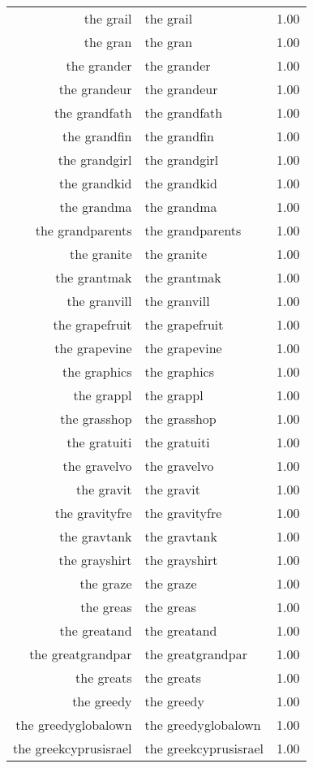 \begin{table}[ht]
\begin{tabular}{rlr}
  the grail & the grail & 1.00 \\ 
  the gran & the gran & 1.00 \\ 
  the grander & the grander & 1.00 \\ 
  the grandeur & the grandeur & 1.00 \\ 
  the grandfath & the grandfath & 1.00 \\ 
  the grandfin & the grandfin & 1.00 \\ 
  the grandgirl & the grandgirl & 1.00 \\ 
  the grandkid & the grandkid & 1.00 \\ 
  the grandma & the grandma & 1.00 \\ 
  the grandparents & the grandparents & 1.00 \\ 
  the granite & the granite & 1.00 \\ 
  the grantmak & the grantmak & 1.00 \\ 
  the granvill & the granvill & 1.00 \\ 
  the grapefruit & the grapefruit & 1.00 \\ 
  the grapevine & the grapevine & 1.00 \\ 
  the graphics & the graphics & 1.00 \\ 
  the grappl & the grappl & 1.00 \\ 
  the grasshop & the grasshop & 1.00 \\ 
  the gratuiti & the gratuiti & 1.00 \\ 
  the gravelvo & the gravelvo & 1.00 \\ 
  the gravit & the gravit & 1.00 \\ 
  the gravityfre & the gravityfre & 1.00 \\ 
  the gravtank & the gravtank & 1.00 \\ 
  the grayshirt & the grayshirt & 1.00 \\ 
  the graze & the graze & 1.00 \\ 
  the greas & the greas & 1.00 \\ 
  the greatand & the greatand & 1.00 \\ 
  the greatgrandpar & the greatgrandpar & 1.00 \\ 
  the greats & the greats & 1.00 \\ 
  the greedy & the greedy & 1.00 \\ 
  the greedyglobalown & the greedyglobalown & 1.00 \\ 
  the greekcyprusisrael & the greekcyprusisrael & 1.00 \\ 

\end{tabular}
\end{table}
